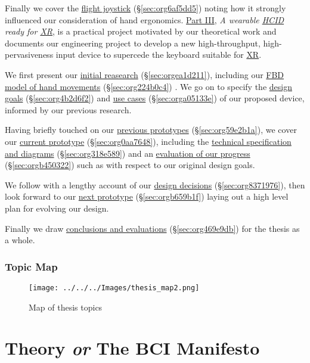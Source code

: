 \documentclass[logo,bsc,singlespacing,parskip]{infthesis}
\begin{document}
Finally we cover the \hyperref[sec:org6af5dd5]{flight joystick} (\S \ref{sec:org6af5dd5}) noting how it strongly influenced our consideration of hand ergonomics.
\hyperref[sec:orgc716832]{Part III}, \emph{A wearable \hyperref[org917851e]{HCID} ready for \hyperref[org53dbe83]{XR}}, is a practical project motivated by our theoretical work and documents our engineering project to develop a new high-throughput, high-pervasiveness input device to supercede the keyboard suitable for \hyperref[org53dbe83]{XR}.

We first present our \hyperref[sec:orgea1d211]{initial reasearch} (\S \ref{sec:orgea1d211}), including our \hyperref[sec:org224b0c4]{FBD model of hand movements} (\S \ref{sec:org224b0c4}) .
We go on to specify the \hyperref[sec:org4b2d6f2]{design goals} (\S \ref{sec:org4b2d6f2}) and \hyperref[sec:orga05133e]{use cases} (\S \ref{sec:orga05133e}) of our proposed device, informed by our previous research.

Having briefly touched on our \hyperref[sec:org59e2b1a]{previous prototypes} (\S \ref{sec:org59e2b1a}), we cover our \hyperref[sec:org0aa7648]{current prototype} (\S \ref{sec:org0aa7648}), including the \hyperref[sec:org318e589]{technical specification and diagrams} (\S \ref{sec:org318e589}) and an \hyperref[sec:orgb450322]{evaluation of our progress} (\S \ref{sec:orgb450322}) such as with respect to our original design goals.

We follow with a lengthy account of our \hyperref[sec:org8371976]{design decisions} (\S \ref{sec:org8371976}), then look forward to our \hyperref[sec:orgb659b1f]{next prototype} (\S \ref{sec:orgb659b1f}) laying out a high level plan for evolving our design.

Finally we draw \hyperref[sec:org469e9db]{conclusions and evaluations} (\S \ref{sec:org469e9db}) for the thesis as a whole.

\section*{Topic Map}
\label{sec:orgcdad3f3}

\begin{figure}[h]
\centering
\texttt{[image: ../../../Images/thesis\_map2.png]}
\caption{Map of thesis topics}
\end{figure}

\part{Theory \emph{or} The BCI Manifesto}
\label{sec:org8312796}
\end{document}
